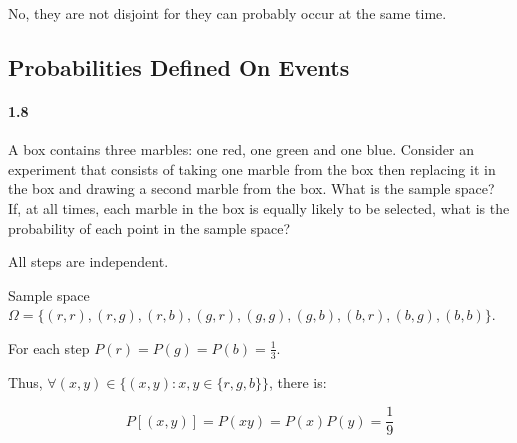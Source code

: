 \begin{solution}

No, they are not disjoint for they can probably occur at the same time.

\end{solution}

\subsection{Probabilities Defined On Events}

\paragraph{1.8}
A box contains three marbles: one red, one green and one blue. Consider an experiment that consists of taking one marble from the box then replacing it in the box and drawing a second marble from the box. What is the sample space? If, at all times, each marble in the box is equally likely to be selected, what is the probability of each point in the sample space?

\begin{solution}

All steps are independent.

Sample space $\Omega = \{(r,r), (r,g), (r,b), (g,r), (g,g), (g,b), (b,r), (b,g), (b,b)\}$.

For each step $P(r) = P(g) = P(b) = \frac{1}{3}$.

Thus, $\forall(x, y)\in \{(x,y):x, y\in\{r, g, b\}\}$, there is:

\begin{equation*}
    P[(x, y)] = P(xy) = P(x)P(y) = \frac{1}{9}
\end{equation*}

\end{solution}





